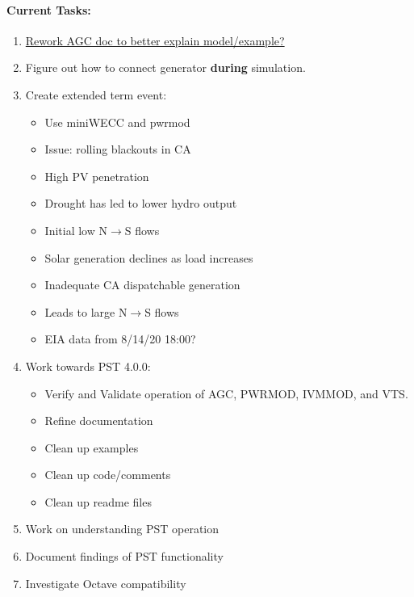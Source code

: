 \documentclass[12pt]{article}
\begin{document}
\begin{multicols}{2}
\paragraph{Current Tasks:}
	\begin{enumerate}
		\itemsep 0em 
		\item \href{https://github.com/thadhaines/MT-Tech-SETO/blob/master/researchDocs/TEX/one-offs/200720-PSTandAGC/200720-PSTandAGC.pdf}{Rework AGC doc to better explain model/example?}
		\item Figure out how to connect generator \textbf{during} simulation.
	\item Create extended term event:
	\begin{itemize}
			\footnotesize
			\itemsep0em
	\item Use miniWECC and pwrmod
	\item Issue: rolling blackouts in CA
	\item High PV penetration
	\item Drought has led to lower hydro output
	\item Initial low N$\longrightarrow$S flows
	\item Solar generation declines as load increases %
	\item Inadequate CA dispatchable generation %
	\item Leads to large N$\longrightarrow$S flows
	\item EIA data from 8/14/20 18:00? %
	\end{itemize}
		\item Work towards PST 4.0.0:
		\begin{itemize}
		\footnotesize
		\itemsep0em
		\item Verify and Validate operation of AGC, PWRMOD, IVMMOD, and VTS.
		\item Refine documentation	
		\item Clean up examples
		\item Clean up code/comments
		\item Clean up readme files
		\end{itemize}
		\item Work on understanding PST operation
		\item Document findings of PST functionality
		\item Investigate Octave compatibility
\end{enumerate}



\end{multicols}
\end{document}
